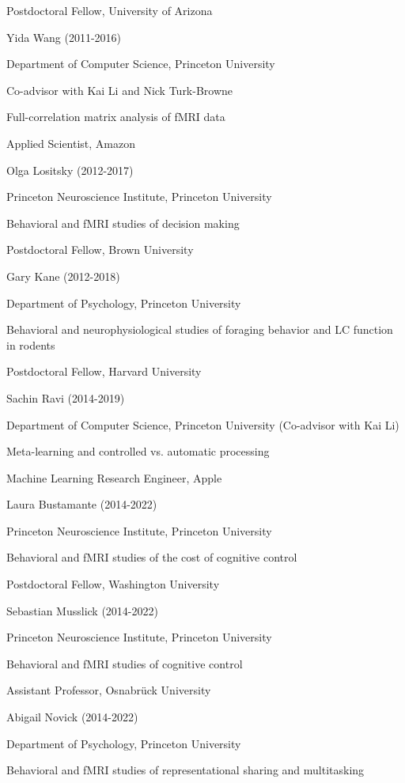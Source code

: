 \documentclass[10 pt]{article}
\begin{document}
Postdoctoral Fellow, University of Arizona
    \medskip

Yida Wang (2011-2016)

Department of Computer Science, Princeton University

Co-advisor with Kai Li and Nick Turk-Browne

Full-correlation matrix analysis of fMRI data

Applied Scientist, Amazon
    \medskip

Olga Lositsky (2012-2017)

Princeton Neuroscience Institute, Princeton University

Behavioral and fMRI studies of decision making

Postdoctoral Fellow, Brown University
    \medskip

Gary Kane (2012-2018)

Department of Psychology, Princeton University

Behavioral and neurophysiological studies of foraging behavior and LC function in rodents

Postdoctoral Fellow, Harvard University
    \medskip

Sachin Ravi (2014-2019)

Department of Computer Science, Princeton University (Co-advisor with Kai Li)

Meta-learning and controlled vs. automatic processing

Machine Learning Research Engineer, Apple
    \medskip

Laura Bustamante (2014-2022)

Princeton Neuroscience Institute, Princeton University

Behavioral and fMRI studies of the cost of cognitive control

Postdoctoral Fellow, Washington University
    \medskip

Sebastian Musslick (2014-2022)

Princeton Neuroscience Institute, Princeton University

Behavioral and fMRI studies of cognitive control

Assistant Professor, Osnabrück University
    \medskip

Abigail Novick (2014-2022)

Department of Psychology, Princeton University

Behavioral and fMRI studies of representational sharing and multitasking
    \medskip
\end{document}
